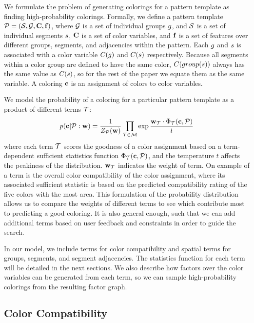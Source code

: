 We formulate the problem of generating colorings for a pattern template as finding high-probability colorings. Formally, we define a pattern template $\mathcal{P} = (\mathcal{S}, \mathcal{G}, \mathbf{C}, \mathbf{f})$, where $\mathcal{G}$ is a set of individual groups $g$, and $\mathcal{S}$ is a set of individual segments $s$, $\mathbf{C}$ is a set of color variables, and $\mathbf{f}$ is a set of features over different groups, segments, and adjacencies within the pattern. Each $g$ and $s$ is associated with a color variable $C(g)$ and $C(s)$ respectively. Because all segments within a color group are defined to have the same color, $C(group(s))$ always has the same value as $C(s)$, so for the rest of the paper we equate them as the same variable. A coloring $\mathbf{c}$ is an assignment of colors to color variables.

We model the probability of a coloring for a particular pattern template as a product of different terms $\mathcal{T}$:   
\begin{equation*}
 p(\mathbf{c} | \mathcal{P} : \mathbf{w}) = \frac{1}{Z_{\mathcal{P}}(\mathbf{w})} \prod_{\mathcal{T} \in \mathcal{M}} \exp{\frac{ \mathbf{w}_{\mathcal{T}}\cdot \Phi_{\mathcal{T}}(\mathbf{c}, \mathcal{P})}{t}}
\end{equation*}
where each term $\mathcal{T}$ scores the goodness of a color assignment based on a term-dependent sufficient statistics function $\Phi_{\mathcal{T}}(\mathbf{c},\mathcal{P})$, and the temperature $t$ affects the peakiness of the distribution. $\mathbf{w}_{\mathcal{T}}$ indicates the weight of term. On example of a term is the overall color compatibility of the color assignment, where its associated sufficient statistic is based on the predicted compatibility rating of the five colors with the most area. This formulation of the probability distribution allows us to compare the weights of different terms to see which contribute most to predicting a good coloring. It is also general enough, such that we can add additional terms based on user feedback and constraints in order to guide the search.

In our model, we include terms for color compatibility and spatial terms for groups, segments, and segment adjacencies. The statistics function for each term will be detailed in the next sections. We also describe how factors over the color variables can be generated from each term, so we can sample high-probability colorings from the resulting factor graph.

\subsection{Color Compatibility}
\label{sec:colorCompat}


